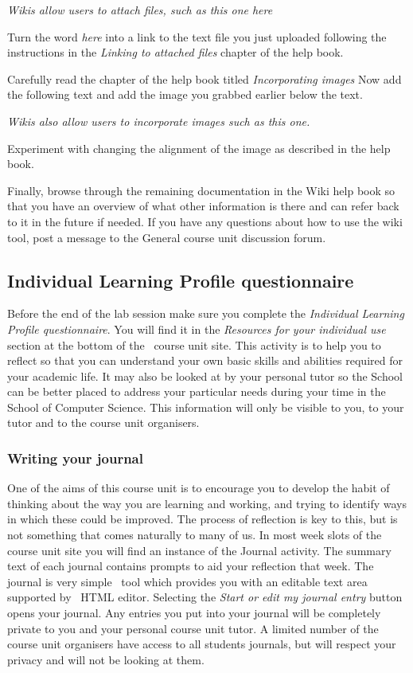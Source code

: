 \emph{Wikis allow users to attach files, such as this one here}  

Turn the word \emph{here} into a link to the text file you just uploaded following the instructions in the \emph{Linking to attached files} chapter of the help book.

Carefully read the chapter of the help book titled \emph{Incorporating images}  Now add the following text and add the image you grabbed earlier below the text.

\emph{Wikis also allow users to incorporate images such as this one.} 

Experiment with changing the alignment of the image as described in the help book.

Finally, browse through the remaining documentation in the Wiki help book so that you have an overview of what other information is there and can refer back to it in the future if needed. If you have any questions about how to use the wiki tool, post a message to the General course unit discussion forum.

\subsection{Individual Learning Profile questionnaire}
\label{sec:indiv-learn-prof}

Before the end of the lab session make sure you complete the \emph{Individual Learning Profile questionnaire}. You will find it in the \emph{Resources for your individual use} section at the bottom of the \moodle\ course unit site. This activity is to help you to reflect so that you can understand your own basic skills and abilities required for your academic life. It may also be looked at by your personal tutor so the School can be better placed to address your particular needs during your time in the School of Computer Science. This information will only be visible to you, to your tutor and to the course unit organisers.

\subsubsection*{Writing your journal}
\label{sec:writing-your-journal}


One of the aims of this course unit is to encourage you to develop the habit of thinking about the way you are learning and working, and trying to identify ways in which these could be improved. The process of reflection is key to this, but is not something that comes naturally to many of us. In most week slots of the course unit site you will find an instance of the Journal activity. The summary text of each journal contains prompts to aid your reflection that week. The journal is very simple \moodle\ tool which provides you with an editable text area supported by \moodle\ HTML editor. Selecting the \emph{Start or edit my journal entry} button opens your journal. Any entries you put into your journal will be completely private to you and your personal course unit tutor. A limited number of the course unit organisers have access to all students journals, but will respect your privacy and will not be looking at them.


